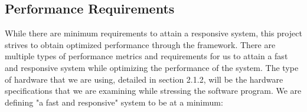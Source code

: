 \documentclass[letterpaper,10pt,draftclsnofoot,onecolumn,compsoc]{IEEEtran}
\begin{document}
\begin{singlespace}
\subsection{Performance Requirements}
\begin{singlespace}
\noindent
While there are minimum requirements to attain a responsive system, this project strives to obtain optimized performance through the framework. There are multiple types of performance metrics and requirements for us to attain a fast and responsive system while optimizing the performance of the system. The type of hardware that we are using, detailed in section 2.1.2, will be the hardware specifications that we are examining while stressing the software program. We are defining "a fast and responsive" system to be at a minimum: \\


\end{singlespace}
\end{singlespace}
\end{document}
